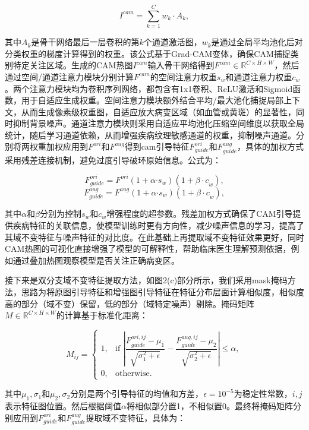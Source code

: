 \[I^{cam} = \sum_{k = 1}^{C}w_{k} \cdot A_{k},
\]

其中\(A_{k}\)是骨干网络最后一层卷积的第\(k\)个通道激活图，\(w_{k}\)是通过全局平均池化后对分类权重的梯度计算得到的权重。该公式基于Grad-CAM变体，确保CAM捕捉类别特定关注区域。生成的CAM热图\(I^{cam}\)输入骨干网络得到\(F^{cam} \in \mathbb{R}^{C \times H \times W}\)，然后通过空间/通道注意力模块分别计算\(F^{cam}\)的空间注意力权重\(s_{w}\)和通道注意力权重\(c_{w}\)。两个注意力模块均为卷积序列网络，都包含有1x1卷积、ReLU激活和Sigmoid函数，用于自适应生成权重。空间注意力模块额外结合平均/最大池化捕捉局部上下文，从而生成像素级权重图，自适应放大病变区域（如血管或黄斑）的显著性，同时抑制背景噪声。通道注意力模块则采用自适应平均池化压缩空间维度以获取全局统计，随后学习通道依赖，从而增强疾病纹理敏感通道的权重，抑制噪声通道。分别将两权重加权应用到\(F^{ori}\)和\(F^{aug}\)得到cam引导特征\(F_{guide}^{ori}\)和\(F_{guide}^{aug}\)，具体的加权方式采用残差连接机制，避免过度引导破环原始信息。公式为：

\[F_{guide}^{ori} = F^{ori}(1 + \alpha{\cdot s}_{w})(1 + {\beta \cdot c}_{w}),
\]\[F_{guide}^{aug} = F^{aug}(1 + \alpha{\cdot s}_{w})(1 + {\beta \cdot c}_{w}),\]

其中\(\alpha\)和\(\beta\)分别为控制\(s_{w}\)和\(c_{w}\)增强程度的超参数。残差加权方式确保了CAM引导提供疾病特征的关联信息，使模型训练时更有方向性，减少噪声信息的学习，提高了其域不变特征与噪声特征的对比度。在此基础上再提取域不变特征效果更好，同时CAM热图的可视化直接增强了模型的可解释性，帮助临床医生理解预测依据，例如通过叠加热图观察模型是否关注正确病变区。

接下来是双分支域不变特征提取方法，如图2(c)部分所示，我们采用mask掩码方法，思路为将原图引导特征和增强图引导特征在特征分布层面计算相似度，相似度高的部分（域不变）保留，低的部分（域特定噪声）剔除。掩码矩阵\(M \in \mathbb{R}^{C \times H \times W}\)的计算基于标准化距离：

\[
M_{ij} =
\left\{
\begin{array}{ll}
1, & \text{if } \left| \dfrac{F_{guide}^{ori,ij} - \mu_{1}}{\sqrt{\sigma_{1}^{2} + \epsilon}} - \dfrac{F_{guide}^{aug,ij} - \mu_{2}}{\sqrt{\sigma_{2}^{2} + \epsilon}} \right| \leq \alpha, \\
0, & \text{otherwise.}
\end{array}
\right.
\]

其中\(\mu_{1},\sigma_{1}\)和\(\mu_{2},\sigma_{2}\)分别是两个引导特征的均值和方差，\(\epsilon = 10^{-5}\)为稳定性常数，\(i,j\)表示特征图位置。然后根据阈值\(\alpha\)将相似部分置1，不相似置0。最终将掩码矩阵分别应用到\(F_{guide}^{ori}\)和\(F_{guide}^{aug}\)提取域不变特征，具体为：

